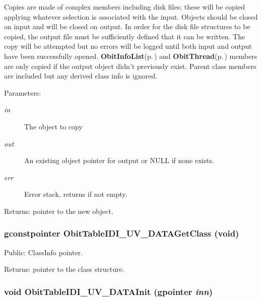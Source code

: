 Copies are made of complex members including disk files; these will be copied applying whatever selection is associated with the input. Objects should be closed on input and will be closed on output. In order for the disk file structures to be copied, the output file must be sufficiently defined that it can be written. The copy will be attempted but no errors will be logged until both input and output have been successfully opened. {\bf Obit\-Info\-List}{\rm (p.\,\pageref{structObitInfoList})} and {\bf Obit\-Thread}{\rm (p.\,\pageref{structObitThread})} members are only copied if the output object didn't previously exist. Parent class members are included but any derived class info is ignored. \begin{Desc}
\item[Parameters:]
\begin{description}
\item[{\em in}]The object to copy \item[{\em out}]An existing object pointer for output or NULL if none exists. \item[{\em err}]Error stack, returns if not empty. \end{description}
\end{Desc}
\begin{Desc}
\item[Returns:]pointer to the new object. \end{Desc}
\subsubsection{\setlength{\rightskip}{0pt plus 5cm}gconstpointer Obit\-Table\-IDI\_\-UV\_\-DATAGet\-Class (void)}\label{ObitTableIDI__UV__DATA_8c_a17}


Public: Class\-Info pointer. 

\begin{Desc}
\item[Returns:]pointer to the class structure. \end{Desc}
\subsubsection{\setlength{\rightskip}{0pt plus 5cm}void Obit\-Table\-IDI\_\-UV\_\-DATAInit (gpointer {\em inn})}\label{ObitTableIDI__UV__DATA_8c_a8}


